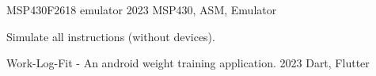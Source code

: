 

\begin{cventries}

  \extraentry
    {MSP430F2618 emulator} %
    {2023} %
    {MSP430, ASM, Emulator}
    {
      \begin{cvitems} %
        \item {Simulate all instructions (without devices).}
      \end{cvitems}
    }

  \extraentry
    {Work-Log-Fit - An android weight training application.} %
    {2023} %
    {Dart, Flutter}
    {
    }

\end{cventries}
